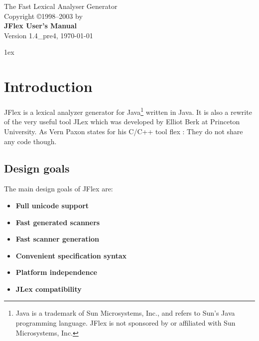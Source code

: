 \documentclass[11pt]{scrartcl}
\newcommand{\ver}{1.4\_pre4}
\begin{document}


\begin{center}
\sffamily
{\Large The Fast Lexical Analyser Generator}\\
\smallskip\smallskip
Copyright \copyright 1998--2003 by \\
\bigskip
{\Huge \sffamily \bfseries JFlex User's Manual}\\
\bigskip
Version \ver, {\today}
\end{center}

\tableofcontents
\vfill
\newpage
\parindent0pt\parskip1ex
\pagestyle{headings}
\section{Introduction\label{Intro}}
JFlex is a lexical analyzer generator for Java\footnote{Java is a trademark of 
Sun Microsystems, Inc., and refers to Sun's Java programming language. 
JFlex is not sponsored by or affiliated with Sun Microsystems, Inc.}
written in Java. It is also a rewrite of the very useful tool JLex \cite{JLex} which
was developed by Elliot Berk at Princeton University. As Vern Paxon states
for his C/C++ tool flex \cite{flex}: They do not share any code though.

\subsection{Design goals}
The main design goals of JFlex are:
\begin{itemize}
\item {\bf Full unicode support}
\item {\bf Fast generated scanners }
\item {\bf Fast scanner generation}
\item {\bf Convenient specification syntax}
\item {\bf Platform independence}
\item {\bf JLex compatibility}
\end{itemize}
\end{document}
